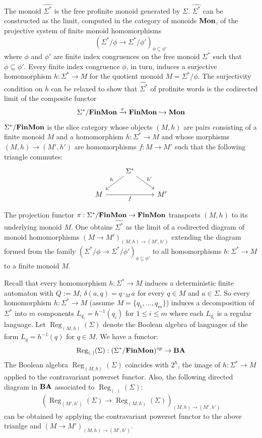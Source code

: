 \documentclass[8pt]{article}
\theoremstyle{definition}
\theoremstyle{definition}
\theoremstyle{definition}
\theoremstyle{definition}
\theoremstyle{definition}
\theoremstyle{definition}
\theoremstyle{definition}
\theoremstyle{definition}
\theoremstyle{definition}
\theoremstyle{definition}
\theoremstyle{definition}
\theoremstyle{definition}
\theoremstyle{definition}
\theoremstyle{definition}
\theoremstyle{question}
\begin{document}
The monoid $\widehat{\Sigma^*}$ is the free profinite monoid generated by $\Sigma$. $\widehat{\Sigma^*}$ can be constructed
as the limit, computed in the category of monoids ${\bf Mon}$, of the projective system of finite monoid
homomorphisms
\[
(\Sigma^*/\phi \to \Sigma^*/\phi')_{\phi \subseteq \phi'}
\]
where $\phi$ and $\phi'$ are finite index congruences on the free monoid $\Sigma^*$ such that $\phi \subseteq \phi'$.
Every finite index congruence $\phi$, in turn, induces a surjective homomorphism $h : \Sigma^* \to M$
for the quotient monoid $M = \Sigma^*/\phi$. The surjectivity condition on $h$ can be relaxed to show that
$\widehat{\Sigma^*}$ of profinite words is the codirected limit of the composite functor
\[
\Sigma^*/{\bf FinMon} \xrightarrow{\pi} {\bf FinMon} \hookrightarrow {\bf Mon}
\]
$\Sigma^*/{\bf FinMon}$ is the slice category whose objects $(M, h)$ are pairs consisting
of a finite monoid $M$ and a homomorphism $h : \Sigma^* \to M$ and whose morphisms 
$(M, h) \to (M',h')$ are homomorphisms $f : M \to M'$ such that the following triangle commutes:
\[
\begin{tikzcd}
  & \Sigma^* \ar[dl, "h"'] \ar[dr, "h'"] \\
M \ar[rr, "f"'] && M'
\end{tikzcd}
\]

The projection functor $\pi : \Sigma^*/{\bf FinMon} \rightarrow {\bf FinMon}$ transports $(M, h)$
to its underlying monoid $M$. One obtains $\widehat{\Sigma^*}$ as the limit of a codirected diagram 
of monoid homomorphisms $(M \to M')_{(M,h) \to (M',h')}$ extending the diagram formed from 
the family $(\Sigma^*/\phi \to \Sigma^*/\phi')_{\phi \subseteq \phi'}$ to all homomorphisms 
$h : \Sigma^* \to M$ to a finite monoid $M$.

Recall that every homomorphism $h : \Sigma^* \to M$ induces a deterministic finite automaton 
with $Q := M$, $\delta(a, q) = q \cdot_M a$ for every $q \in M$ and $a \in \Sigma$. 
So every homomorphism $h : \Sigma^* \to M$ (assume $M = \{ q_1, \ldots, q_m\}$) induces a decomposition of $\Sigma^*$
into $m$ components $L_{q_i} = h^{-1}(q_i)$ for $1 \leq i \leq m$ where each $L_{q_i}$ is a regular language.
Let $\operatorname{Reg}_{(M,h)}(\Sigma)$ denote the Boolean algebra of languages of the form $L_q = h^{-1}(q)$
for $q \in M$. We have a functor:
\[
\operatorname{Reg}_{(.)}(\Sigma) : (\Sigma^*/{\bf FinMon})^{op} \to {\bf BA}
\]
The Boolean algebra $\operatorname{Reg}_{(M,h)}(\Sigma)$ coincides with $2^h$, the image of $h : \Sigma^* \to M$ 
applied to the contravariant powerset functor. Also, the following directed diagram in ${\bf BA}$ associated to
$\operatorname{Reg}_{(.)}(\Sigma)$:
\[
(\operatorname{Reg}_{(M',h')}(\Sigma) \to \operatorname{Reg}_{(M,h)}(\Sigma))_{(M,h) \to (M',h')}
\]
can be obtained by applying the contravariant powerset functor to the above trianlge and $(M \to M')_{(M,h) \to (M',h')}$.
\end{document}
